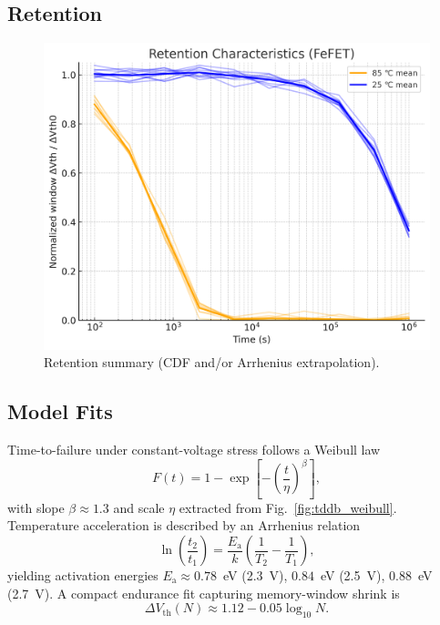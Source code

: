 \documentclass[conference]{IEEEtran}
\newcommand{\Vth}{V_{\mathrm{th}}}
\newcommand{\Ea}{E_{\mathrm{a}}}
\newcommand{\betaW}{\beta} %
\newcommand{\etaW}{\eta}   %
\newcommand{\figw}{0.90\linewidth}
\begin{document}
\subsection{Retention}
\begin{figure}[!t]
  \centering
  \includegraphics[width=\figw]{figures/fig6_retention.png}
  \caption{Retention summary (CDF and/or Arrhenius extrapolation).}
  \label{fig:retention}
\end{figure}

\subsection{Model Fits}
Time-to-failure under constant-voltage stress follows a Weibull law
\begin{equation}
  F(t)=1-\exp\!\left[-\left(\frac{t}{\etaW}\right)^{\betaW}\right],
\end{equation}
with slope $\betaW \approx 1.3$ and scale $\etaW$ extracted from Fig.~\ref{fig:tddb_weibull}.
Temperature acceleration is described by an Arrhenius relation
\begin{equation}
  \ln\!\left(\frac{t_2}{t_1}\right)=\frac{\Ea}{k}\!\left(\frac{1}{T_2}-\frac{1}{T_1}\right),
\end{equation}
yielding activation energies $\Ea \approx 0.78$~eV (2.3~V), $0.84$~eV (2.5~V), $0.88$~eV (2.7~V).
A compact endurance fit capturing memory-window shrink is
\begin{equation}
  \Delta \Vth(N) \approx 1.12 - 0.05\log_{10} N.
\end{equation}
\end{document}
